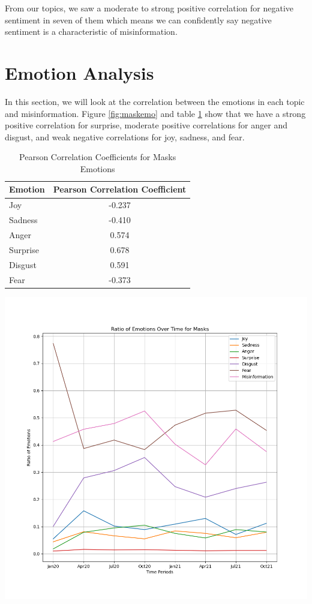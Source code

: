 \documentclass{l4proj}
\begin{document}
From our topics, we saw a moderate to strong positive correlation for negative sentiment in seven of them which means we can confidently say negative sentiment is a characteristic of misinformation.

\section{Emotion Analysis}
In this section, we will look at the correlation between the emotions in each topic and misinformation. Figure \ref{fig:maskemo} and table \ref{tab:maskemo} show that we have a strong positive correlation for surprise, moderate positive correlations for anger and disgust, and weak negative correlations for joy, sadness, and fear. 

\begin{table}[H]
\begin{minipage}[c]{0.30\linewidth}
\centering
\begin{tabular}{@{}lc@{}}
\toprule
Emotion  & \multicolumn{1}{l}{Pearson Correlation Coefficient} \\ \midrule
Joy      & -0.237                                              \\
Sadness  & -0.410                                              \\
Anger    & 0.574                                               \\
Surprise & 0.678                                               \\
Disgust  & 0.591                                               \\
Fear     & -0.373                                              \\ \bottomrule
\end{tabular}
\caption{Pearson Correlation Coefficients for Masks Emotions}
\label{tab:maskemo}
\end{minipage}\hfill
\begin{minipage}[c]{0.55\linewidth}
\centering
\includegraphics[width=\textwidth]{images/MasksEmotion.png}

\end{minipage}
\end{table}
\end{document}
